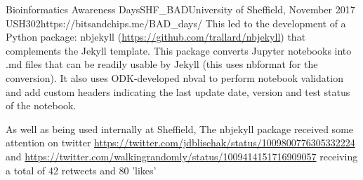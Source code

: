 \begin{event}{Bioinformatics Awareness Days}{SHF_BAD}{University of Sheffield, November 2017 }{USH}{30}{2}{https://bitsandchips.me/BAD_days/}
This led to the development of a Python package: nbjekyll (\url{https://github.com/trallard/nbjekyll}) that complements the Jekyll template. This package converts Jupyter notebooks into .md files that can be readily usable by Jekyll (this uses nbformat for the conversion). It also uses ODK-developed nbval to perform notebook validation and add custom headers indicating the last update date, version and test status of the notebook.

As well as being used internally at Sheffield, The nbjekyll package received some attention on twitter \url{https://twitter.com/jdblischak/status/1009800776305332224} and \url{https://twitter.com/walkingrandomly/status/1009414151716909057} receiving a total of 42 retweets and 80 'likes'

\end{event}
